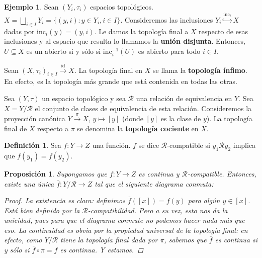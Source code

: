 \documentclass[12pt]{book}
\newtheorem{prop}[teo]{Proposición}
\theoremstyle{definition}
\newtheorem{defn}[teo]{Definición}
\newtheorem{ex}[teo]{Ejemplo}
\newcommand{\Rel}{\mathscr{R}}
\DeclareMathOperator{\id}{id}
\begin{document}
\begin{ex}
Sean $(Y_i,\tau_i)$ espacios topológicos. $X=\displaystyle\bigsqcup_{i\in I} Y_i = \{(y,i):y\in Y_i, i\in I\}$. Consideremos las inclusiones $Y_i\stackrel{\mathrm{inc}_i}{\hookrightarrow} X$ dadas por $\mathrm{inc}_i(y) = (y,i)$. Le damos la topología final a $X$ respecto de esas inclusiones y al espacio que resulta lo llamamos la \textbf{unión disjunta}. Entonces, $U\subseteq X$ es un abierto si y sólo si $\mathrm{inc}_i^{-1}(U)$ es abierto para todo $i\in I$.

Sean $(X,\tau_i)_{i\in I}\stackrel{\id}{\longrightarrow} X$. La topología final en $X$ se llama la \textbf{topología ínfimo}. En efecto, es la topología más grande que está contenida en todas las otras.

Sea $(Y,\tau)$ un espacio topológico y sea $\Rel$ una relación de equivalencia en $Y$. Sea $X = Y/\Rel$ el conjunto de clases de equivalencia de esta relación. Consideremos la proyección canónica $Y\stackrel{\pi}{\longrightarrow} X$, $y\mapsto [y]$ (donde $[y]$ es la clase de $y$). La topología final de $X$ respecto a $\pi$ se denomina la \textbf{topología cociente} en $X$.
\end{ex}

\begin{defn}
Sea $f:Y\to Z$ una función. $f$ se dice $\Rel$-compatible si $y_1\Rel y_2$ implica que $f(y_1)=f(y_2)$.
\end{defn}

\begin{prop}
Supongamos que $f:Y\to Z$ es continua y $\Rel$-compatible. Entonces, existe una única $\overline{f}:Y/\Rel\to Z$ tal que el siguiente diagrama conmuta:
\begin{center}
\end{center}
\begin{proof}
La existencia es clara: definimos $\overline{f}([x]) = f(y)$ para algún $y\in [x]$. Está bien definido por la $\Rel$-compatibilidad. Pero a su vez, esto nos da la unicidad, pues para que el diagrama conmute no podemos hacer nada más que eso. La continuidad es obvia por la propiedad universal de la topología final: en efecto, como $Y/\Rel$ tiene la topología final dada por $\pi$, sabemos que $\overline{f}$ es continua si y sólo si $\overline{f}\circ\pi = f$ es continua. Y estamos.
\end{proof}
\end{prop}
\end{document}
